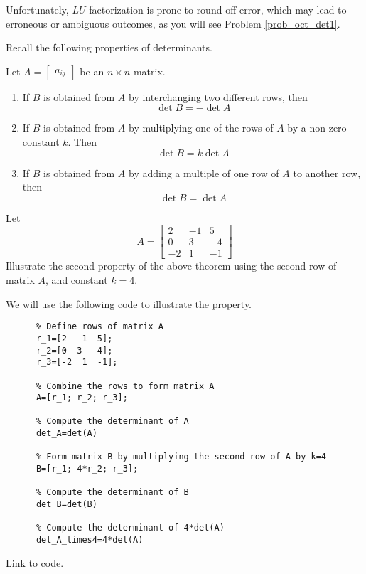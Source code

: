 \documentclass{ximera}
\begin{document}
Unfortunately, $LU$-factorization is prone to round-off error, which may lead to erroneous or ambiguous outcomes, as you will see Problem \ref{prob_oct_det1}.

Recall the following properties of determinants.

\begin{theorem}[\ref{th:elemrowopsanddet}]
  Let $A=\begin{bmatrix}a_{ij}\end{bmatrix}$ be an $n\times n$ matrix. 
  \begin{enumerate}
  \item\label{item:rowswapanddet}
  If $B$ is obtained from $A$ by interchanging two different rows, then $$\det{B}=-\det{A}$$
  \item \label{item:rowconstantmultanddet}
  If $B$ is obtained from $A$ by multiplying one of the rows of $A$ by a non-zero constant $k$.  Then $$\det{B}=k\det{A}$$
  \item \label{item:addmultotherrowdet}
  If $B$ is obtained from $A$ by adding a multiple of one row of $A$ to another row, then
  $$\det{B}=\det{A}$$
  \end{enumerate}
  \end{theorem}

\begin{example}\label{ex_det_prop}
  Let $$A=\begin{bmatrix}
  2 & -1 & 5\\0 & 3 & -4\\-2 & 1 & -1
  \end{bmatrix}$$
  Illustrate the second property of the above theorem using the second row of matrix $A$, and constant $k=4$.
  \begin{explanation}
    We will use the following code to illustrate the property.
    \begin{verbatim}
      % Define rows of matrix A
      r_1=[2  -1  5];
      r_2=[0  3  -4];
      r_3=[-2  1  -1];

      % Combine the rows to form matrix A
      A=[r_1; r_2; r_3];

      % Compute the determinant of A
      det_A=det(A)

      % Form matrix B by multiplying the second row of A by k=4
      B=[r_1; 4*r_2; r_3];

      % Compute the determinant of B
      det_B=det(B)

      % Compute the determinant of 4*det(A)
      det_A_times4=4*det(A)
    \end{verbatim}

    \href{https://sagecell.sagemath.org/?z=eJyVjrEKgzAURXfBf3iLUAWhajpJBtPSn5AiWmMbahKJkda_bxIV3EqXNxzuO5wALrRjgoKS7xFkB7zWin2g8D1VJbhMAeIE4HTLLUhxeQTIDEMLyHAZm0liV5b4XgBnyRtr1M_VqiV0UvGdusClsedgjPZku9dh0strSzVVnIlaaNtlvgypCmzuoQiX_XWnJdDMwKdes6GfmXg4yUjvUrQ2wzns5IWR75E1AEV_JJAlgbgEEv7co2hrdeWVZpyOCG_4C2FMb7M=&lang=octave&interacts=eJyLjgUAARUAuQ==}{Link to code}.
  \end{explanation}

\end{example}
\end{document}
